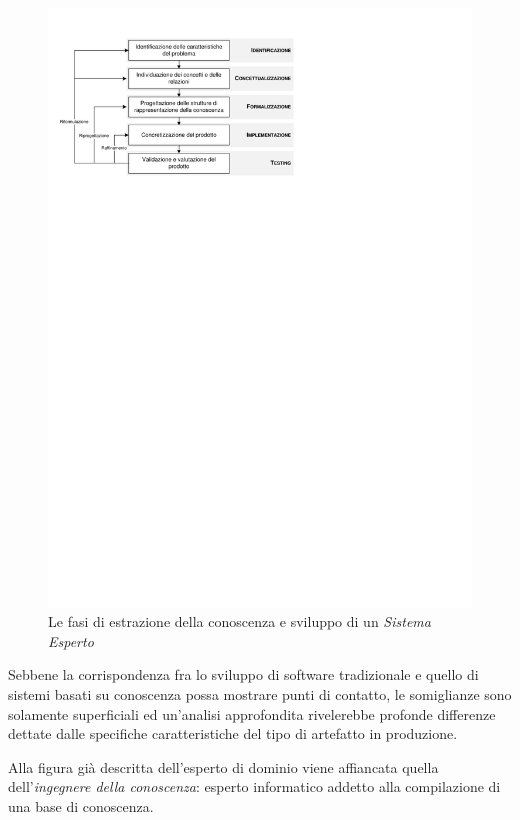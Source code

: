 \begin{figure}[h]
\centering
\includegraphics[viewport=16 607 346 801]{Immagini/Capitolo1/Fasi-acquisizione.pdf}
\caption{Le fasi di estrazione della conoscenza e sviluppo di un \emph{Sistema Esperto}}\label{fig:fasi-progettazione}
\end{figure}


Sebbene la corrispondenza fra lo sviluppo di software tradizionale e quello di sistemi basati su conoscenza possa mostrare punti di contatto, le somiglianze sono solamente superficiali ed un'analisi approfondita rivelerebbe profonde differenze dettate dalle specifiche caratteristiche del tipo di artefatto in produzione. \cite{esposito2012icse}

Alla figura già descritta dell'esperto di dominio viene affiancata quella dell'\emph{ingegnere della conoscenza}: esperto informatico addetto alla compilazione di una base di conoscenza.

